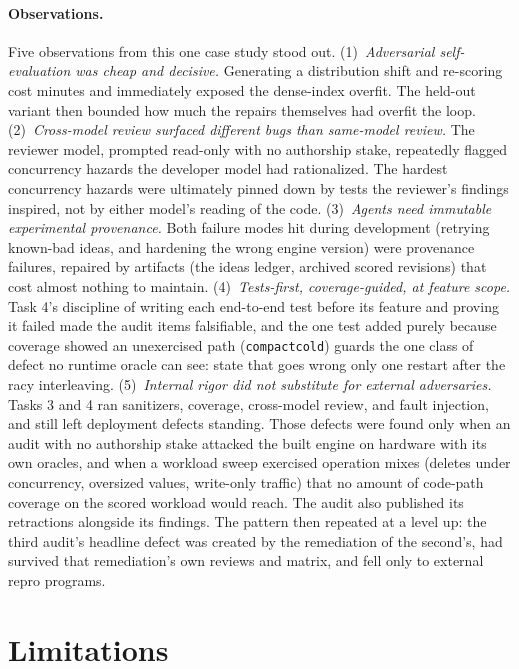 \documentclass{article}
\begin{document}
\paragraph{Observations.}
Five observations from this one case study stood out. (1)~\emph{Adversarial self-evaluation was cheap and decisive.} Generating a distribution shift and re-scoring cost minutes and immediately exposed the dense-index overfit. The held-out variant then bounded how much the repairs themselves had overfit the loop. (2)~\emph{Cross-model review surfaced different bugs than same-model review.} The reviewer model, prompted read-only with no authorship stake, repeatedly flagged concurrency hazards the developer model had rationalized. The hardest concurrency hazards were ultimately pinned down by tests the reviewer's findings inspired, not by either model's reading of the code. (3)~\emph{Agents need immutable experimental provenance.} Both failure modes hit during development (retrying known-bad ideas, and hardening the wrong engine version) were provenance failures, repaired by artifacts (the ideas ledger, archived scored revisions) that cost almost nothing to maintain. (4)~\emph{Tests-first, coverage-guided, at feature scope.} Task 4's discipline of writing each end-to-end test before its feature and proving it failed made the audit items falsifiable, and the one test added purely because coverage showed an unexercised path (\texttt{compactcold}) guards the one class of defect no runtime oracle can see: state that goes wrong only one restart after the racy interleaving. (5)~\emph{Internal rigor did not substitute for external adversaries.} Tasks 3 and 4 ran sanitizers, coverage, cross-model review, and fault injection, and still left deployment defects standing. Those defects were found only when an audit with no authorship stake attacked the built engine on hardware with its own oracles, and when a workload sweep exercised operation mixes (deletes under concurrency, oversized values, write-only traffic) that no amount of code-path coverage on the scored workload would reach. The audit also published its retractions alongside its findings. The pattern then repeated at a level up: the third audit's headline defect was created by the remediation of the second's, had survived that remediation's own reviews and matrix, and fell only to external repro programs.

\section{Limitations}
\label{sec:limits}
\end{document}
